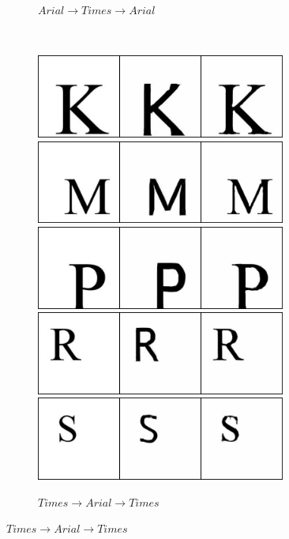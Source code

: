 \documentclass[10pt,twocolumn,letterpaper]{article}
\begin{document}
\begin{figure}[!htb]
\begin{subfigure}[]{0.49\textwidth}
		 \caption{$Arial \rightarrow Times \rightarrow Arial$}
         \label{fig:arial2times}
     \end{subfigure}
     ~
     \begin{subfigure}[]{0.49\textwidth}
         \centering
         \includegraphics[width=0.9\textwidth]{test_b_2_a_94}\\
         \vspace{0.3cm}
		 \includegraphics[width=0.9\textwidth]{test_b_2_a_117}\\
		 \vspace{0.3cm}
		 \includegraphics[width=0.9\textwidth]{test_b_2_a_136}\\
		 \vspace{0.3cm}
		 \includegraphics[width=0.9\textwidth]{test_b_2_a_160}\\
		 \vspace{0.3cm}
		 \includegraphics[width=0.9\textwidth]{test_b_2_a_171}
		 \caption{$Times \rightarrow Arial \rightarrow Times$}
         \label{fig:times2arial}
     \end{subfigure}


\end{figure}
\end{document}
